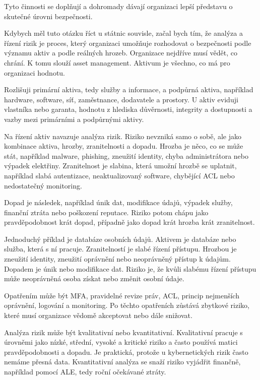 Tyto činnosti se doplňují a dohromady dávají organizaci lepší představu o skutečné úrovni bezpečnosti.

Kdybych měl tuto otázku říct u státnic souvisle, začal bych tím, že analýza a řízení rizik je proces, který organizaci umožňuje rozhodovat o bezpečnosti podle významu aktiv a podle reálných hrozeb. Organizace nejdříve musí vědět, co chrání. K tomu slouží asset management. Aktivum je všechno, co má pro organizaci hodnotu.

Rozlišuji primární aktiva, tedy služby a informace, a podpůrná aktiva, například hardware, software, síť, zaměstnance, dodavatele a prostory. U aktiv eviduji vlastníka nebo garanta, hodnotu z hlediska důvěrnosti, integrity a dostupnosti a vazby mezi primárními a podpůrnými aktivy.

Na řízení aktiv navazuje analýza rizik. Riziko nevzniká samo o sobě, ale jako kombinace aktiva, hrozby, zranitelnosti a dopadu. Hrozba je něco, co se může stát, například malware, phishing, zneužití identity, chyba administrátora nebo výpadek elektřiny. Zranitelnost je slabina, která umožní hrozbě se uplatnit, například slabá autentizace, neaktualizovaný software, chybějící ACL nebo nedostatečný monitoring.

Dopad je následek, například únik dat, modifikace údajů, výpadek služby, finanční ztráta nebo poškození reputace. Riziko potom chápu jako pravděpodobnost krát dopad, případně jako dopad krát hrozba krát zranitelnost.

Jednoduchý příklad je databáze osobních údajů. Aktivem je databáze nebo služba, která s ní pracuje. Zranitelností je slabé řízení přístupu. Hrozbou je zneužití identity, zneužití oprávnění nebo neoprávněný přístup k údajům. Dopadem je únik nebo modifikace dat. Riziko je, že kvůli slabému řízení přístupu může neoprávněná osoba získat nebo změnit osobní údaje.

Opatřením může být MFA, pravidelné revize práv, ACL, princip nejmenších oprávnění, logování a monitoring. Po těchto opatřeních zůstává zbytkové riziko, které musí organizace vědomě akceptovat nebo dále snižovat.

Analýza rizik může být kvalitativní nebo kvantitativní. Kvalitativní pracuje s úrovněmi jako nízké, střední, vysoké a kritické riziko a často používá matici pravděpodobnosti a dopadu. Je praktická, protože u kybernetických rizik často nemáme přesná data. Kvantitativní analýza se snaží riziko vyjádřit finančně, například pomocí ALE, tedy roční očekávané ztráty.

